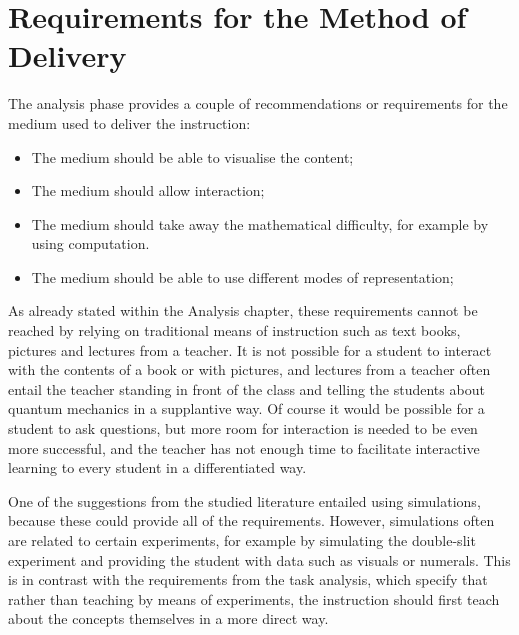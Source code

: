 \documentclass[11pt,twoside]{report} %
\begin{document}
\section{Requirements for the Method of Delivery}

The analysis phase provides a couple of recommendations or requirements for the medium used to deliver the instruction:

\begin{itemize}
\item The medium should be able to visualise the content;
\item The medium should allow interaction;
\item The medium should take away the mathematical difficulty, for example by using computation.
\item The medium should be able to use different modes of representation;
\end{itemize}

As already stated within the Analysis chapter, these requirements cannot be reached by relying on traditional means of instruction such as text books, pictures and lectures from a teacher. It is not possible for a student to interact with the contents of a book or with pictures, and lectures from a teacher often entail the teacher standing in front of the class and telling the students about quantum mechanics in a supplantive way. Of course it would be possible for a student to ask questions, but more room for interaction is needed to be even more successful, and the teacher has not enough time to facilitate interactive learning to every student in a differentiated way.

One of the suggestions from the studied literature entailed using simulations, because these could provide all of the requirements. However, simulations often are related to certain experiments, for example by simulating the double-slit experiment and providing the student with data such as visuals or numerals. This is in contrast with the requirements from the task analysis, which specify that rather than teaching by means of experiments, the instruction should first teach about the concepts themselves in a more direct way.
\end{document}
